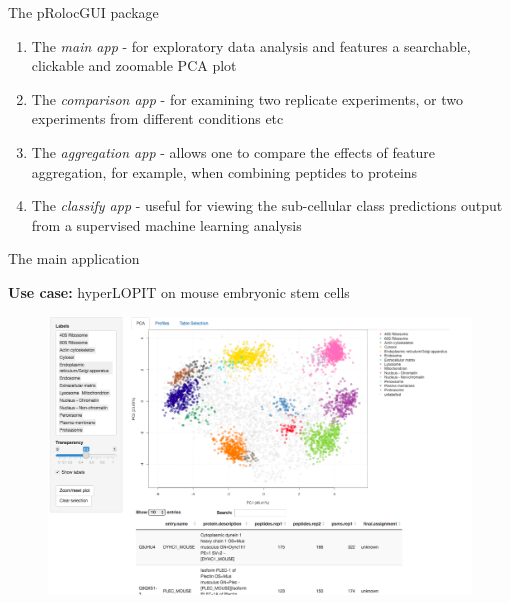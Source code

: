 \documentclass[bigger]{beamer}
\begin{document}

\begin{frame}{The pRolocGUI package}
 \begin{small}
\begin{enumerate}
\item The \textit{main app} - for exploratory data analysis and features a 
searchable, clickable and zoomable PCA plot 
\item The \textit{comparison app} - for examining two replicate experiments, 
or two experiments from different conditions etc
\item The \textit{aggregation app} - allows one to compare the effects of 
feature aggregation, for example, when combining peptides to proteins
\item The \textit{classify app} - useful for viewing the sub-cellular class 
predictions output from a supervised machine learning analysis
\end{enumerate}
\end{small}
\end{frame}



\begin{frame}{The main application}
\smallskip
  \begin{small} \textbf{Use case:} hyperLOPIT on mouse embryonic stem cells
  \end{small}
  \begin{figure}
    \includegraphics[width=1\linewidth]{Figures/main-app.png}
  \end{figure}
\end{frame}
\end{document}
